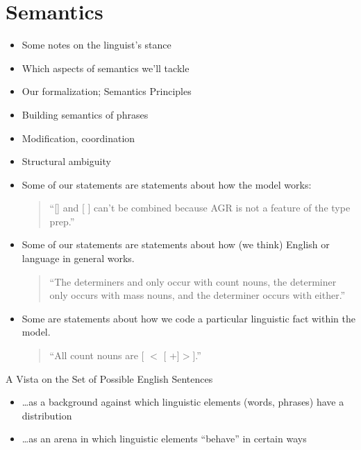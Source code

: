 \documentclass[a4paper,landscape,headrule,footrule]{foils}
\begin{document}
\section{Semantics}

\begin{itemize}
\item Some notes on the linguist's stance
\item Which aspects of semantics we’ll tackle
\item Our formalization; Semantics Principles
\item Building semantics of phrases
\item Modification, coordination
\item Structural ambiguity
\end{itemize}



\begin{itemize}
\item Some of our statements are statements about how the model
works:
\begin{quote}
  “[] and [ ] can’t be combined because AGR is not a
  feature of the type prep.”
\end{quote}
\item Some of our statements are statements about how (we think)
English or language in general works.
\begin{quote}
  “The determiners  and  only occur with count nouns, the
  determiner  only occurs with mass nouns, and the determiner 
  occurs with either.”
\end{quote}
\item Some are statements about how we code a particular
linguistic fact within the model.
\begin{quote}
  “All count nouns are [  $<$ [ +]$>$].”
\end{quote}
\end{itemize}


A Vista on the Set of Possible English Sentences
\begin{itemize}
\item \ldots  as a background against which linguistic
  elements (words, phrases) have a distribution
\item \ldots  as an arena in which linguistic elements
  “behave” in certain ways
\end{itemize}
\end{document}
